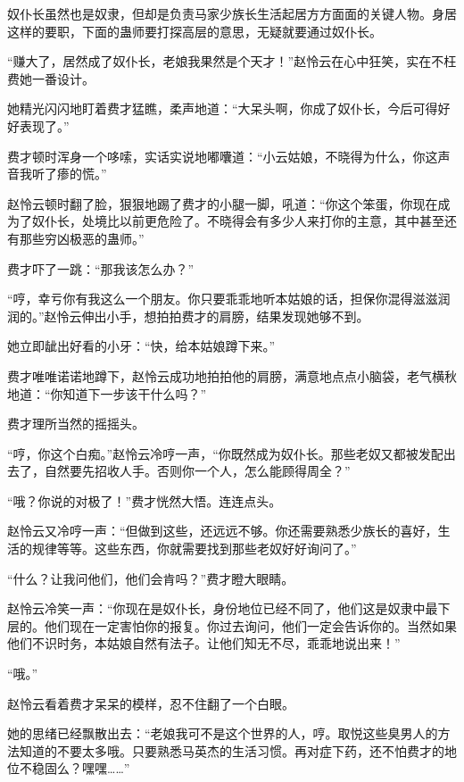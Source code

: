 
\begin{this_body}

奴仆长虽然也是奴隶，但却是负责马家少族长生活起居方方面面的关键人物。身居这样的要职，下面的蛊师要打探高层的意思，无疑就要通过奴仆长。

“赚大了，居然成了奴仆长，老娘我果然是个天才！”赵怜云在心中狂笑，实在不枉费她一番设计。

她精光闪闪地盯着费才猛瞧，柔声地道：“大呆头啊，你成了奴仆长，今后可得好好表现了。”

费才顿时浑身一个哆嗦，实话实说地嘟囔道：“小云姑娘，不晓得为什么，你这声音我听了瘆的慌。”

赵怜云顿时翻了脸，狠狠地踢了费才的小腿一脚，吼道：“你这个笨蛋，你现在成为了奴仆长，处境比以前更危险了。不晓得会有多少人来打你的主意，其中甚至还有那些穷凶极恶的蛊师。”

费才吓了一跳：“那我该怎么办？”

“哼，幸亏你有我这么一个朋友。你只要乖乖地听本姑娘的话，担保你混得滋滋润润的。”赵怜云伸出小手，想拍拍费才的肩膀，结果发现她够不到。

她立即龇出好看的小牙：“快，给本姑娘蹲下来。”

费才唯唯诺诺地蹲下，赵怜云成功地拍拍他的肩膀，满意地点点小脑袋，老气横秋地道：“你知道下一步该干什么吗？”

费才理所当然的摇摇头。

“哼，你这个白痴。”赵怜云冷哼一声，“你既然成为奴仆长。那些老奴又都被发配出去了，自然要先招收人手。否则你一个人，怎么能顾得周全？”

“哦？你说的对极了！”费才恍然大悟。连连点头。

赵怜云又冷哼一声：“但做到这些，还远远不够。你还需要熟悉少族长的喜好，生活的规律等等。这些东西，你就需要找到那些老奴好好询问了。”

“什么？让我问他们，他们会肯吗？”费才瞪大眼睛。

赵怜云冷笑一声：“你现在是奴仆长，身份地位已经不同了，他们这是奴隶中最下层的。他们现在一定害怕你的报复。你过去询问，他们一定会告诉你的。当然如果他们不识时务，本姑娘自然有法子。让他们知无不尽，乖乖地说出来！”

“哦。”

赵怜云看着费才呆呆的模样，忍不住翻了一个白眼。

她的思绪已经飘散出去：“老娘我可不是这个世界的人，哼。取悦这些臭男人的方法知道的不要太多哦。只要熟悉马英杰的生活习惯。再对症下药，还不怕费才的地位不稳固么？嘿嘿……”


\end{this_body}
